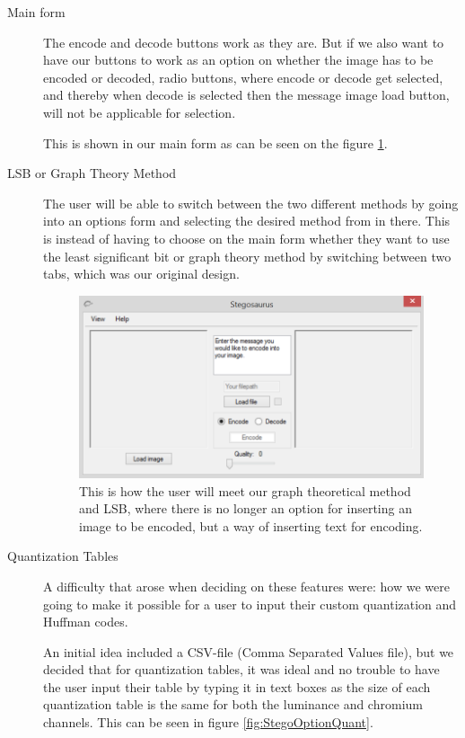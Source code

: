 \begin{description}
\item[Main form]
The encode and decode buttons work as they are.
But if we also want to have our buttons to work as an option on whether the image has to be encoded or decoded, radio buttons, where encode or decode get selected, and thereby when decode is selected then the message image load button, will not be applicable for selection.

This is shown in our main form as can be seen on the figure \ref{fig:StegoMainForm}.

\item[LSB or Graph Theory Method]
The user will be able to switch between the two different methods by going into an options form and selecting the desired method from in there. This is instead of having to choose on the main form whether they want to use the least significant bit or graph theory method by switching between two tabs, which was our original design.

\begin{figure}
	\centering
	\includegraphics[width=1\textwidth]{figures/StegoMainForm.png}
	\caption{This is how the user will meet our graph theoretical method and LSB, where there is no longer an option for inserting an image to be encoded, but a way of inserting text for encoding.}
	\label{fig:StegoMainForm}
\end{figure}

\item[Quantization Tables]
A difficulty that arose when deciding on these features were: how we were going to make it possible for a user to input their custom quantization and Huffman codes.

An initial idea included a CSV-file (Comma Separated Values file), but we decided that for quantization tables, it was ideal and no trouble to have the user input their table by typing it in text boxes as the size of each quantization table is the same for both the luminance and chromium channels. This can be seen in figure \ref{fig:StegoOptionQuant}.



\end{description}
